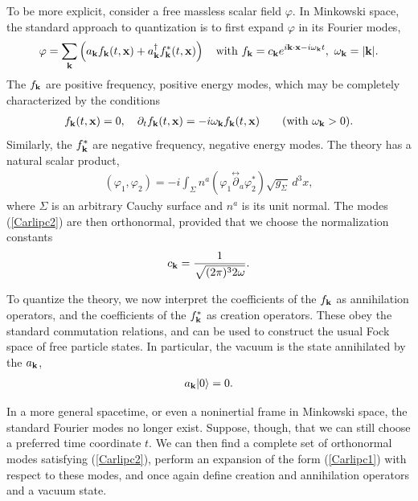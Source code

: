\documentclass[11pt]{article}
\begin{document}
To be more explicit,  consider a free massless
scalar field $\varphi$.  In  Minkowski space, the standard approach
to quantization \cite{BirrellDavies} is to first expand $\varphi$ in its 
Fourier modes,
\begin{align}
\varphi = \sum_{\bf k} \left(a_{\bf k}f_{\bf k}(t,{\bf x}) 
  + a_{\bf k}^\dagger f_{\bf k}^*(t,{\bf x})\right) 
  \quad \mathrm{with}
  \ f_{\bf k} = c_{\bf k}e^{i{\bf k}\cdot{\bf x} - i\omega_{\bf k}t},\ 
  \omega_{\bf k} =  |{\bf k}|   .
\label{Carlipc1}
\end{align}
The $f_{\bf k}$ are positive frequency, positive energy modes,
which may be completely characterized by the conditions
\begin{align}
\Box  f_{\bf k}(t,{\bf x}) = 0, \quad 
 \partial_t f_{\bf k}(t,{\bf x}) 
   = -i\omega_{\bf k}f_{\bf k}(t,{\bf x}) \qquad\hbox{(with $\omega_{\bf k}>0$)} .
\label{Carlipc2}
\end{align}
Similarly, the $f_{\bf k}^*$  are negative frequency, negative energy modes.
The theory has a natural scalar product,
\begin{align}
(\varphi_1,\varphi_2) = -i\int_\Sigma n^a(\varphi_1
   \overset{\leftrightarrow}{\partial}_a\varphi_2^*)\sqrt{g_{\scriptscriptstyle\Sigma}}
   \,d^3x,
\label{Carlipc2a}
\end{align}
where $\Sigma$ is an arbitrary Cauchy surface  and $n^a$ is its unit normal.    
The modes (\ref{Carlipc2}) are then orthonormal, provided that we choose the
normalization constants
\begin{align}
c_{\bf k} = \frac{1}{\sqrt{(2\pi)^3 2\omega}}  .
\label{Carlipc2b}
\end{align}

To quantize the theory, we now interpret the coefficients of the $f_{\bf k}$ as 
annihilation operators, and the coefficients of the $f_{\bf k}^*$ as creation 
operators.  These obey the standard commutation relations, and can be
used to construct the usual Fock space of free particle states.  In particular,
the vacuum is the state annihilated by the $a_{\bf k}$,
\begin{align}
a_{\bf k} |0\rangle = 0  .
\label{Carlipc3}
\end{align}

In a more general spacetime, 
or even a noninertial frame in Minkowski space, the standard 
Fourier modes no longer exist.  Suppose, though, that we can still choose
a  preferred time coordinate $t$.  We can then find a complete set 
of orthonormal modes satisfying (\ref{Carlipc2}),  perform an expansion 
of the form (\ref{Carlipc1}) with respect to these modes, and once again 
define creation and annihilation operators and a vacuum state.  
\end{document}
